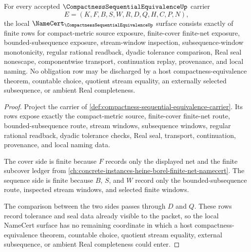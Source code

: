 \begin{theorem}
\label{thm:compactness-sequential-equivalence-namecert-obligations}
For every accepted $\CompactnessSequentialEquivalenceUp$ carrier
$$
E=(K,F,B,S,W,R,D,Q,H,C,P,N),
$$
the local $\NameCert_{\CompactnessSequentialEquivalenceUp}$ surface consists exactly of finite rows for compact-metric source exposure, finite-cover finite-net exposure, bounded-subsequence exposure, stream-window inspection, subsequence-window monotonicity, regular rational readback, dyadic tolerance comparison, Real seal nonescape, componentwise transport, continuation replay, provenance, and local naming. No obligation row may be discharged by a host compactness-equivalence theorem, countable choice, quotient stream equality, an externally selected subsequence, or ambient Real completeness.
\end{theorem}
\begin{proof}
Project the carrier of \autoref{def:compactness-sequential-equivalence-carrier}. Its rows expose exactly the compact-metric source, finite-cover finite-net route, bounded-subsequence route, stream windows, subsequence windows, regular rational readback, dyadic tolerance checks, Real seal, transport, continuation, provenance, and local naming data.

The cover side is finite because $F$ records only the displayed net and the finite subcover ledger from \autoref{ch:concrete-instances-heine-borel-finite-net-namecert}. The sequence side is finite because $B$, $S$, and $W$ record only the bounded-subsequence route, inspected stream windows, and selected finite windows.

The comparison between the two sides passes through $D$ and $Q$. These rows record tolerance and seal data already visible to the packet, so the local NameCert surface has no remaining coordinate in which a host compactness-equivalence theorem, countable choice, quotient stream equality, external subsequence, or ambient Real completeness could enter.
\end{proof}

